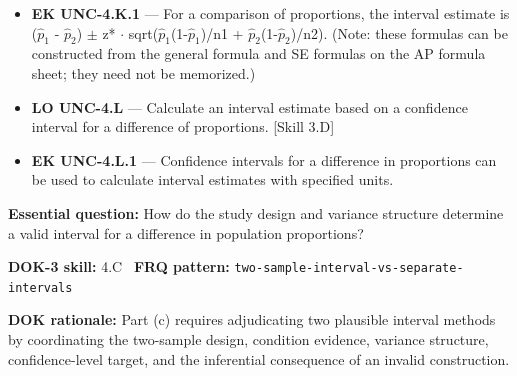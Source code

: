 \documentclass[11pt]{article}
\begin{document}
{\begin{itemize}[leftmargin=1.5em,itemsep=2pt,topsep=2pt]
  \item \textbf{EK UNC-4.K.1} --- For a comparison of proportions, the interval estimate is ($\widehat p_1$ - $\widehat p_2$) $\pm$ z* $\cdot$ sqrt($\widehat p_1$(1-$\widehat p_1$)/n1 + $\widehat p_2$(1-$\widehat p_2$)/n2). (Note: these formulas can be constructed from the general formula and SE formulas on the AP formula sheet; they need not be memorized.)
  \item \textbf{LO UNC-4.L} --- Calculate an interval estimate based on a confidence interval for a difference of proportions. [Skill 3.D]
  \item \textbf{EK UNC-4.L.1} --- Confidence intervals for a difference in proportions can be used to calculate interval estimates with specified units.
\end{itemize}
}
\textbf{Essential question:} How do the study design and variance structure determine a valid interval for a difference in population proportions?\par
\textbf{DOK-3 skill:} 4.C \textperiodcentered\ \textbf{FRQ pattern:} {\small\texttt{two-\allowbreak{}sample-\allowbreak{}interval-\allowbreak{}vs-\allowbreak{}separate-\allowbreak{}intervals}}\par
\textbf{DOK rationale:} Part (c) requires adjudicating two plausible interval methods by coordinating the two-sample design, condition evidence, variance structure, confidence-level target, and the inferential consequence of an invalid construction.\par

\end{document}
